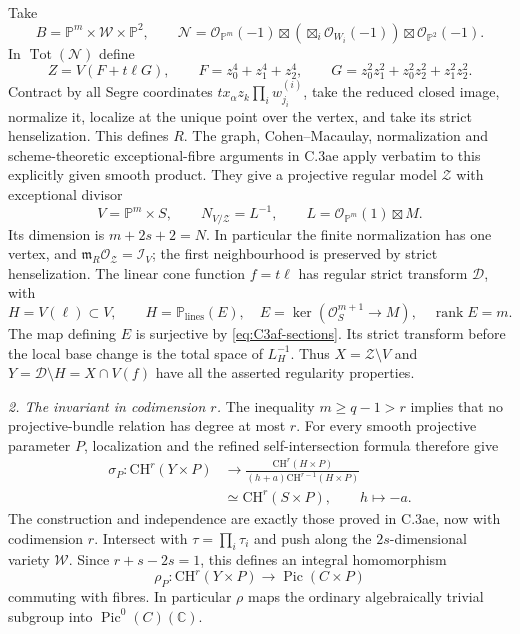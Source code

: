 Take
\[
 B=\mathbb P^m\times\mathcal W\times\mathbb P^2,
 \qquad
 \mathcal N=\mathcal O_{\mathbb P^m}(-1)
       \boxtimes\left(\boxtimes_i\mathcal O_{W_i}(-1)\right)
       \boxtimes\mathcal O_{\mathbb P^2}(-1).
\]
In $\operatorname{Tot}(\mathcal N)$ define
\[
 Z=V(F+t\ell G),\qquad
 F=z_0^4+z_1^4+z_2^4,\qquad
 G=z_0^2z_1^2+z_0^2z_2^2+z_1^2z_2^2.
\]
Contract by all Segre coordinates
$t x_\alpha z_k\prod_i w^{(i)}_{j_i}$, take the reduced
closed image, normalize it, localize at the unique point
over the vertex, and take its strict henselization.
This defines $R$. The graph, Cohen--Macaulay,
normalization and scheme-theoretic exceptional-fibre
arguments in C.3ae apply verbatim to this explicitly
given smooth product. They give a projective regular
model $\mathcal Z$ with exceptional divisor
\[
 V=\mathbb P^m\times S,
 \qquad N_{V/\mathcal Z}=L^{-1},
 \qquad L=\mathcal O_{\mathbb P^m}(1)\boxtimes M.
\]
Its dimension is $m+2s+2=N$. In particular the
finite normalization has one vertex, and
$\mathfrak m_R\mathcal O_{\mathcal Z}=\mathcal I_V$;
the first neighbourhood is preserved by strict
henselization. The linear cone function $f=t\ell$ has
regular strict transform $\mathcal D$, with
\[
 H=V(\ell)\subset V,
 \qquad
 H=\mathbb P_{\mathrm{lines}}(E),
 \quad E=\ker(\mathcal O_S^{m+1}\to M),
 \quad\operatorname{rank}E=m.
\]
The map defining $E$ is surjective by
\eqref{eq:C3af-sections}. Its strict transform before
the local base change is the total space of $L_H^{-1}$.
Thus $X=\mathcal Z\setminus V$ and
$Y=\mathcal D\setminus H=X\cap V(f)$ have all the
asserted regularity properties.

\emph{2. The invariant in codimension $r$.}
The inequality $m\ge q-1>r$ implies that no
projective-bundle relation has degree at most $r$.
For every smooth projective parameter $P$, localization
and the refined self-intersection formula therefore give
\[
\begin{split}
 \sigma_P:\mathrm{CH}^r(Y\times P)&\longrightarrow
 \frac{\mathrm{CH}^r(H\times P)}
 {(h+a)\mathrm{CH}^{r-1}(H\times P)}\\
 &\simeq\mathrm{CH}^r(S\times P),\qquad h\longmapsto-a.
\end{split}
\]
The construction and independence are exactly those
proved in C.3ae, now with codimension $r$.
Intersect with $\tau=\prod_i\tau_i$ and push along
the $2s$-dimensional variety $\mathcal W$. Since
$r+s-2s=1$, this defines an integral homomorphism
\[
 \rho_P:\mathrm{CH}^r(Y\times P)
                \longrightarrow\operatorname{Pic}(C\times P)
\]
commuting with fibres. In particular $\rho$ maps the
ordinary algebraically trivial subgroup into
$\operatorname{Pic}^0(C)(\mathbb C)$.

